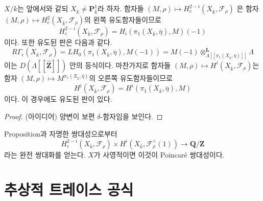 \begin{proposition}
\label{proposition-curve-kpi1}
$X/k$는 앞에서와 같되
$X_{\overline{k}}\neq \mathbf{P}^1_{\overline{k}}$라 하자. 함자들
$
(M, \rho)\mapsto H_c^{2-i}(X_{\overline{k}}, \mathcal{F}_\rho)
$
은 함자 $(M, \rho)\mapsto H_c^2(X_{\overline{k}}, \mathcal{F}_\rho)$의
왼쪽 유도함자들이므로
$$
H_c^{2-i}(X_{\overline{k}}, \mathcal{F}_\rho) =
H_i(\pi_1(X_{\overline{k}}, \overline \eta), M)(-1)
$$
이다. 또한 유도된 판은 다음과 같다.
$$
R\Gamma_c(X_{\overline{k}}, \mathcal{F}_\rho)
=
LH_0(\pi_1(X_{\overline{k}}, \overline \eta), M(-1))
=
M(-1)
\otimes_{\Lambda[[\pi_1(X_{\overline{k}}, \overline \eta)]]}^\mathbf{L}
\Lambda
$$
이는 $D(\Lambda[[\widehat{\mathbf{Z}}]])$ 안의 등식이다. 마찬가지로 함자들
$(M, \rho)\mapsto H^i(X_{\overline{k}}, \mathcal{F}_\rho)$는 함자
$(M, \rho)\mapsto M^{\pi_1(X_{\overline{k}}, \overline \eta)}$의 오른쪽
유도함자들이므로
$$
H^i(X_{\overline{k}}, \mathcal{F}_\rho) =
H^i(\pi_1(X_{\overline{k}}, \overline \eta), M)
$$
이다. 이 경우에도 유도된 판이 있다.
\end{proposition}

\begin{proof}
(아이디어) 양변이 보편 $\delta$-함자임을 보인다.
\end{proof}

\begin{remark}
\label{remark-poincare-groups}
Proposition과 자명한 쌍대성으로부터
$$
H^{2-i}_c(X_{\overline{k}}, \mathcal{F}_\rho)
\times
H^i(X_{\overline{k}}, \mathcal{F}_\rho^\wedge(1))
\to
\mathbf{Q}/\mathbf{Z}
$$
라는 완전 쌍대화를 얻는다. $X$가 사영적이면 이것이 Poincaré 쌍대성이다.
\end{remark}




\section{추상적 트레이스 공식}
\label{section-abstract-trace-formula}

